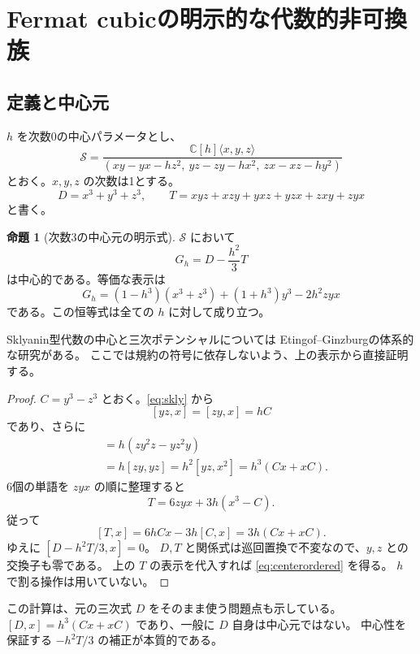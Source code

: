\documentclass[a4paper,11pt]{ltjsarticle}
\newcommand{\mathscr}{\mathcal}
\theoremstyle{definition}
\newtheorem{theorem}{命題}[section]
\newcommand{\CC}{\mathbb C}
\begin{document}
\section{Fermat cubicの明示的な代数的非可換族}

\subsection{定義と中心元}

$h$ を次数0の中心パラメータとし、
\begin{equation}\label{eq:skly}
 \mathscr S=
 \frac{\CC[h]\langle x,y,z\rangle}
 {(xy-yx-hz^2,\ yz-zy-hx^2,\ zx-xz-hy^2)}
\end{equation}
とおく。$x,y,z$ の次数は1とする。
\[
 D=x^3+y^3+z^3,\qquad
 T=xyz+xzy+yxz+yzx+zxy+zyx
\]
と書く。

\begin{theorem}[次数3の中心元の明示式]\label{thm:center}
$\mathscr S$ において
\begin{equation}\label{eq:center}
 G_h=D-\frac{h^2}{3}T
\end{equation}
は中心的である。等価な表示は
\begin{equation}\label{eq:centerordered}
 G_h=(1-h^3)(x^3+z^3)+(1+h^3)y^3-2h^2zyx
\end{equation}
である。この恒等式は全ての $h$ に対して成り立つ。
\end{theorem}

Sklyanin型代数の中心と三次ポテンシャルについては
Etingof--Ginzburg\cite{EG}の体系的な研究がある。
ここでは規約の符号に依存しないよう、上の表示から直接証明する。

\begin{proof}
$C=y^3-z^3$ とおく。\eqref{eq:skly} から
\[
 [yz,x]=[zy,x]=hC
\]
であり、さらに
\begin{align*}
 [D,x]
 &=h(zy^2z-yz^2y)\\
 &=h[zy,yz]
 =h^2[yz,x^2]
 =h^3(Cx+xC).
\end{align*}
6個の単語を $zyx$ の順に整理すると
\[
 T=6zyx+3h(x^3-C).
\]
従って
\[
 [T,x]=6hCx-3h[C,x]=3h(Cx+xC).
\]
ゆえに $[D-h^2T/3,x]=0$。
$D,T$ と関係式は巡回置換で不変なので、$y,z$ との交換子も零である。
上の $T$ の表示を代入すれば \eqref{eq:centerordered} を得る。
$h$ で割る操作は用いていない。
\end{proof}

この計算は、元の三次式 $D$ をそのまま使う問題点も示している。
$[D,x]=h^3(Cx+xC)$ であり、一般に $D$ 自身は中心元ではない。
中心性を保証する $-h^2T/3$ の補正が本質的である。
\end{document}
